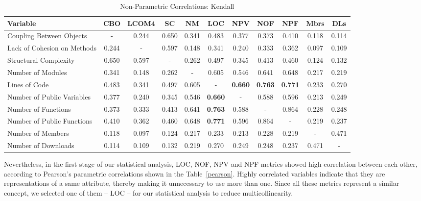 \documentclass[conference]{IEEEtran}
\begin{document}
\begin{center}
\begin{table}[bt]
\centering \caption{Non-Parametric Correlations: Kendall}
\begin{tabular}{|l|c|c|c|c|c|c|c|c|c|c|} \hline

\textbf{Variable} 	    & CBO & LCOM4 & SC & NM & LOC & NPV & NOF & NPF & Mbrs & DLs
\\ \hline
Coupling Between Objects      & - & 0.244 & 0.650 & 0.341 & 0.483 & 0.377 & 0.373 & 0.410 & 0.118 & 0.114
\\ \hline
Lack of Cohesion on Methods & 0.244 & - & 0.597 & 0.148 & 0.341 & 0.240 & 0.333 & 0.362 & 0.097 & 0.109
\\ \hline
Structural Complexity       & 0.650 & 0.597 & - & 0.262 & 0.497 & 0.345 & 0.413 & 0.460 & 0.124 & 0.132
\\ \hline
Number of Modules           & 0.341 & 0.148 & 0.262 & - & 0.605 & 0.546 & 0.641 & 0.648 & 0.217 & 0.219
\\ \hline
Lines of Code               & 0.483 & 0.341 & 0.497 & 0.605 & - & \textbf{0.660} & \textbf{0.763} & \textbf{0.771} & 0.233 & 0.270
\\ \hline
Number of Public Variables  & 0.377 & 0.240 & 0.345 & 0.546 & \textbf{0.660} & - & 0.588 & 0.596 & 0.213 & 0.249
\\ \hline
Number of Functions         & 0.373 & 0.333 & 0.413 & 0.641 & \textbf{0.763} & 0.588 & - & 0.864 & 0.228 & 0.248
\\ \hline
Number of Public Functions  & 0.410 & 0.362 & 0.460 & 0.648 & \textbf{0.771} & 0.596 & 0.864 & - & 0.219 & 0.237
\\ \hline
Number of Members           & 0.118 & 0.097 & 0.124 & 0.217 & 0.233 & 0.213 & 0.228 & 0.219 & - & 0.471
\\ \hline
Number of Downloads         & 0.114 & 0.109 & 0.132 & 0.219 & 0.270 & 0.249 & 0.248 & 0.237 & 0.471 & -
\\ \hline
\end{tabular}
\label{kendall}
\end{table}
\end{center}

Nevertheless, in the first stage of our statistical analysis, LOC, NOF, NPV and NPF metrics 
showed high correlation between each other, according to Pearson's
parametric correlations shown in the Table~\ref{pearson}.
%
Highly correlated variables indicate that they are representations of
a same attribute, thereby making it unnecessary to use more than one.
%
Since all these metrics represent a similar concept, we selected one of them -- LOC -- 
for our statistical analysis to reduce multicollinearity.
\end{document}
